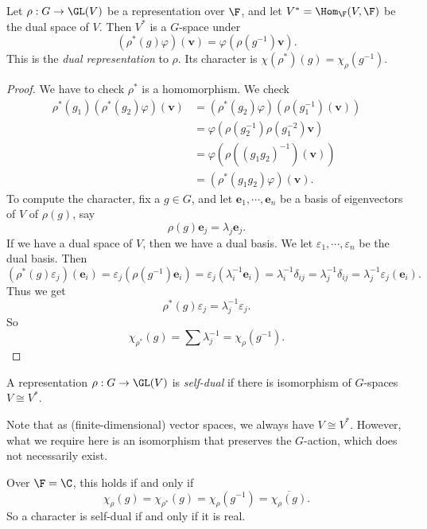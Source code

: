 \documentclass[a4paper]{article}
\begin{document}
\begin{lemma}
  Let $\rho: G \to \GL(V)$ be a representation over $\F$, and let $V^* = \Hom_\F (V, \F)$ be the dual space of $V$. Then $V^*$ is a $G$-space under
  \[
    (\rho^*(g) \varphi)(\mathbf{v}) = \varphi(\rho(g^{-1})\mathbf{v}).
  \]
  This is the \emph{dual representation} to $\rho$. Its character is $\chi(\rho^*)(g) = \chi_\rho(g^{-1})$.
\end{lemma}

\begin{proof}
  We have to check $\rho^*$ is a homomorphism. We check
  \begin{align*}
    \rho^*(g_1)(\rho^*(g_2)\varphi)(\mathbf{v}) &= (\rho^*(g_2)\varphi)(\rho(g_1^{-1})(\mathbf{v}))\\
    &= \varphi(\rho(g_2^{-1})\rho(g_1^{-2}) \mathbf{v})\\
    &= \varphi(\rho((g_1g_2)^{-1})(\mathbf{v}))\\
    &= (\rho^*(g_1g_2) \varphi)(\mathbf{v}).
  \end{align*}
  To compute the character, fix a $g \in G$, and let $\mathbf{e}_1, \cdots, \mathbf{e}_n$ be a basis of eigenvectors of $V$ of $\rho(g)$, say
  \[
    \rho(g) \mathbf{e}_j = \lambda_j \mathbf{e}_j.
  \]
  If we have a dual space of $V$, then we have a dual basis. We let $\varepsilon_1,\cdots, \varepsilon_n$ be the dual basis. Then
  \[
    (\rho^*(g) \varepsilon_j)(\mathbf{e}_i) = \varepsilon_j(\rho(g^{-1}) \mathbf{e}_i) = \varepsilon_j (\lambda_i^{-1} \mathbf{e}_i) = \lambda_i^{-1} \delta_{ij} = \lambda_j^{-1} \delta_{ij} = \lambda_j^{-1} \varepsilon_j(\mathbf{e}_i).
  \]
  Thus we get
  \[
    \rho^*(g) \varepsilon_j = \lambda_j^{-1} \varepsilon_j.
  \]
  So
  \[
    \chi_{\rho^*}(g) = \sum \lambda_j^{-1} = \chi_\rho(g^{-1}).
  \]
\end{proof}

\begin{defi}
  A representation $\rho: G \to \GL(V)$ is \emph{self-dual} if there is isomorphism of $G$-spaces $V\cong V^*$.
\end{defi}
Note that as (finite-dimensional) vector spaces, we always have $V \cong V^*$. However, what we require here is an isomorphism that preserves the $G$-action, which does not necessarily exist.

Over $\F = \C$, this holds if and only if
\[
  \chi_\rho(g) = \chi_{\rho^{*}} (g) = \chi_\rho(g^{-1}) = \overline{\chi_\rho(g)}.
\]
So a character is self-dual if and only if it is real.
\end{document}
